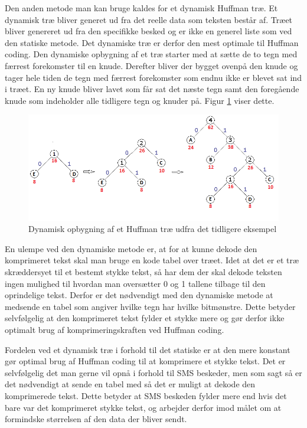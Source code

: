 Den anden metode man kan bruge kaldes for et dynamisk Huffman træ. Et dynamisk træ bliver generet ud fra det reelle data som teksten består af. Træet bliver genereret ud fra den specifikke besked og er ikke en generel liste som ved den statiske metode. Det dynamiske træ er derfor den mest optimale til Huffman coding. Den dynamiske opbygning af et træ starter med at sætte de to tegn med færrest forekomster til en knude. Derefter bliver der bygget ovenpå den knude og tager hele tiden de tegn med færrest forekomster som endnu ikke er blevet sat ind i træet. En ny knude bliver lavet som får sat det næste tegn samt den foregående knude som indeholder alle tidligere tegn og knuder på. Figur \ref{fig:dynamic_tree} viser dette.

\begin{figure}[H]
\centering
\includegraphics[width=\linewidth]{Billeder/dynamisk.png}
\caption{Dynamisk opbygning af et Huffman træ udfra det tidligere eksempel \cite{Hufftree_1}}
\label{fig:dynamic_tree}
\end{figure}

En ulempe ved den dynamiske metode er, at for at kunne dekode den komprimeret tekst skal man bruge en kode tabel over træet. Idet at det er et træ skræddersyet til et bestemt stykke tekst, så har dem der skal dekode teksten ingen mulighed til hvordan man oversætter 0 og 1 tallene tilbage til den oprindelige tekst. Derfor er det nødvendigt med den dynamiske metode at medsende en tabel som angiver hvilke tegn har hvilke bitmønstre. Dette betyder selvfølgelig at den komprimeret tekst fylder et stykke mere og gør derfor ikke optimalt brug af komprimeringskraften ved Huffman coding. \cite{Hufftree_4}

Fordelen ved et dynamisk træ i forhold til det statiske er at den mere konstant gør optimal brug af Huffman coding til at komprimere et stykke tekst. Det er selvfølgelig det man gerne vil opnå i forhold til SMS beskeder, men som sagt så er det nødvendigt at sende en tabel med så det er muligt at dekode den komprimerede tekst. Dette betyder at SMS beskeden fylder mere end hvis det bare var det komprimeret stykke tekst, og arbejder derfor imod målet om at formindske størrelsen af den data der bliver sendt.